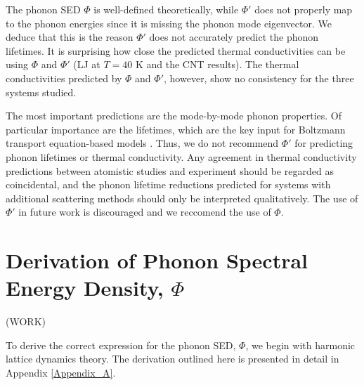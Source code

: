 The phonon SED $\Phi$ is well-defined theoretically, while $\Phi'$ does 
not properly map to the 
phonon energies since it is missing the phonon mode eigenvector. We deduce 
that this is the reason 
$\Phi'$ does not accurately predict the phonon lifetimes. It is surprising 
how close the predicted 
thermal conductivities can be using $\Phi$ and $\Phi'$ (LJ at $T=40$ K and 
the CNT results). The 
thermal conductivities predicted by $\Phi$ and $\Phi'$, however, show no 
consistency for the three 
systems studied.

The most important predictions are the mode-by-mode phonon properties. Of 
particular importance are 
the lifetimes, which are the key input for Boltzmann transport 
equation-based models 
\cite{mcgaughey_size-dependent_2011}. Thus, we do not recommend $\Phi'$ 
for predicting phonon lifetimes or 
thermal conductivity.  Any agreement in thermal conductivity predictions 
between atomistic 
studies\cite{thomas_predicting_2010} and experiment
\cite{dekoker_thermal_2009,qiu_molecular_2011} should 
be regarded as 
coincidental, and the phonon lifetime reductions predicted for systems 
with additional scattering 
methods \cite{thomas_predicting_2010,shiomi_thermal_2011} should only 
be interpreted qualitatively. The use of $\Phi'$ 
in future work is discouraged and we reccomend the use of $\Phi$.

\section{\label{Appendix_A}Derivation of Phonon Spectral Energy Density, 
$\Phi$}
(WORK)


To derive the correct expression for the phonon SED, $\Phi$, we begin 
with harmonic lattice dynamics theory.\cite{wallace_thermodynamics_1972,
dove_introduction_1993} The 
derivation outlined here is presented in detail in Appendix 
\ref{Appendix_A}.

